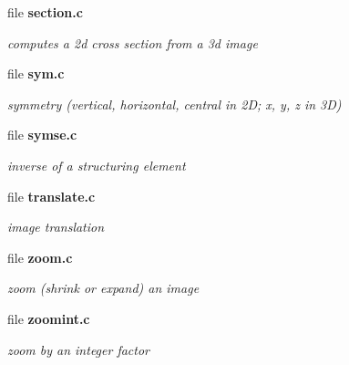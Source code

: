 \begin{DoxyCompactItemize}
\item 
file {\bf section.c}


\begin{DoxyCompactList}\small\item\em computes a 2d cross section from a 3d image \item\end{DoxyCompactList}

\item 
file {\bf sym.c}


\begin{DoxyCompactList}\small\item\em symmetry (vertical, horizontal, central in 2D; x, y, z in 3D) \item\end{DoxyCompactList}

\item 
file {\bf symse.c}


\begin{DoxyCompactList}\small\item\em inverse of a structuring element \item\end{DoxyCompactList}

\item 
file {\bf translate.c}


\begin{DoxyCompactList}\small\item\em image translation \item\end{DoxyCompactList}

\item 
file {\bf zoom.c}


\begin{DoxyCompactList}\small\item\em zoom (shrink or expand) an image \item\end{DoxyCompactList}

\item 
file {\bf zoomint.c}


\begin{DoxyCompactList}\small\item\em zoom by an integer factor \item\end{DoxyCompactList}

\end{DoxyCompactItemize}
